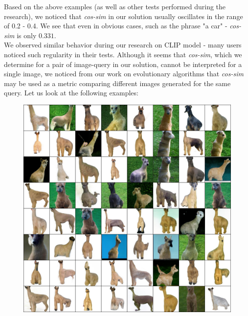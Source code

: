 \documentclass[12pt,a4paper,openany]{book}
\begin{document}

\noindent Based on the above examples (as well as other tests performed during the research), we noticed that \textit{cos-sim} in our solution usually oscillates in the range of 0.2 - 0.4. We see that even in obvious cases, such as the phrase "a car" - \textit{cos-sim} is only $0.331$.  \\
\noindent We observed similar behavior during our research on CLIP model - many users noticed such regularity in their tests.
Although it seems that \textit{cos-sim}, which we determine for a pair of image-query in our solution, cannot be interpreted for a single image, we noticed from our work on evolutionary algorithms that \textit{cos-sim} may be used as a metric comparing different images generated for the same query. Let us look at the following examples:
\begin{figure}[H]
    \centering
    \includegraphics[scale=0.1]{figs/batch_loop_7.jpg}
\end{figure}
\end{document}
